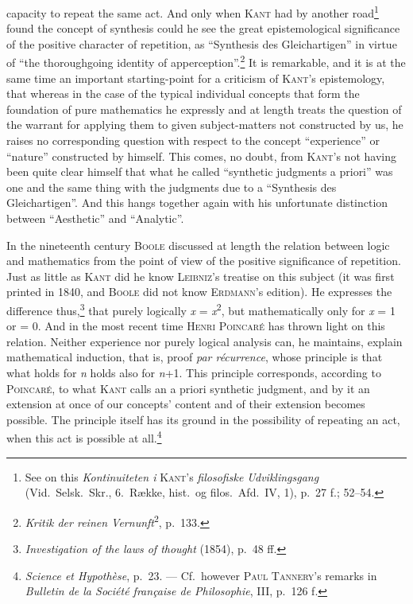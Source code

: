 \documentclass[12pt]{book}
\newcommand{\opage}[1]{\marginnote{\footnotesize\textit{[#1]}}}
\begin{document}
capacity to repeat the same act. And only when \textsc{Kant} had by another
road\footnote{See on this \textit{Kontinuiteten i} \textsc{Kant}'s
\textit{filosofiske Udviklingsgang} (Vid.\ Selsk.\ Skr., 6.\ Række, hist.\ og
filos.\ Afd.\ IV, 1), p.\ 27 f.; 52--54.} found the concept of synthesis could he
see the great epistemological significance of the positive character of
repetition, as ``Synthesis des Gleichartigen'' in virtue of ``the thoroughgoing
identity of apperception''.\footnote{\textit{Kritik der reinen
Vernunft}\textsuperscript{2}, p.\ 133.} It is remarkable, and it is at the same
time an important starting-point for a criticism of \textsc{Kant}'s epistemology,
that whereas in the case of the typical individual concepts that form the
foundation \opage{37}of pure mathematics he expressly and at length treats the question of
the warrant for applying them to given subject-matters not constructed by us, he
raises no corresponding question with respect to the concept ``experience'' or
``nature'' constructed by himself. This comes, no doubt, from \textsc{Kant}'s not
having been quite clear himself that what he called ``synthetic judgments a
priori'' was one and the same thing with the judgments due to a ``Synthesis des
Gleichartigen''. And this hangs together again with his unfortunate distinction
between ``Aesthetic'' and ``Analytic''.

In the nineteenth century \textsc{Boole} discussed at length the relation between
logic and mathematics from the point of view of the positive significance of
repetition. Just as little as \textsc{Kant} did he know \textsc{Leibniz}'s
treatise on this subject (it was first printed in 1840, and \textsc{Boole} did
not know \textsc{Erdmann}'s edition). He expresses the difference
thus,\footnote{\textit{Investigation of the laws of thought} (1854), p.\ 48 ff.}
that purely logically \textit{x} = \textit{x}\textsuperscript{2}, but
mathematically only for \textit{x} = 1 or = 0. And in the most recent time
\textsc{Henri Poincaré} has thrown light on this relation. Neither experience nor
purely logical analysis can, he maintains, explain mathematical induction, that
is, proof \textit{par récurrence}, whose principle is that what holds for
\textit{n} holds also for \textit{n}+1. This principle corresponds, according to
\textsc{Poincaré}, to what \textsc{Kant} calls an a priori synthetic judgment,
and by it an extension at once of our concepts' content and of their extension
becomes possible. The principle itself has its ground in the possibility of
repeating an act, when this act is possible at
all.\footnote{\textit{Science et Hypothèse}, p.\ 23. --- Cf.\ however
\textsc{Paul Tannery}'s remarks in \textit{Bulletin de la Société française de
Philosophie}, III, p.\ 126 f.}
\end{document}
